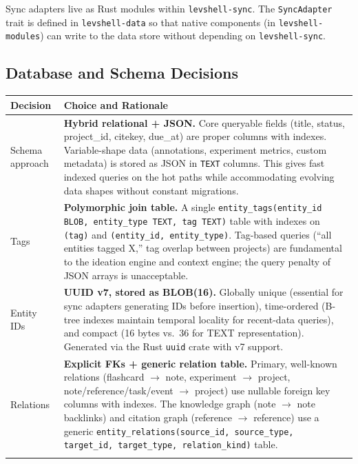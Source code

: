 \documentclass[11pt,a4paper]{article}
\begin{document}
Sync adapters live as Rust modules within \texttt{levshell-sync}. The \texttt{SyncAdapter} trait is defined in \texttt{levshell-data} so that native components (in \texttt{levshell-modules}) can write to the data store without depending on \texttt{levshell-sync}.


\subsection{Database and Schema Decisions}
\label{sec:db-decisions}

\begin{longtable}{p{4.5cm} p{9cm}}
\toprule
\textbf{Decision} & \textbf{Choice and Rationale} \\
\midrule
Schema approach & \textbf{Hybrid relational + JSON.} Core queryable fields (title, status, project\_id, citekey, due\_at) are proper columns with indexes. Variable-shape data (annotations, experiment metrics, custom metadata) is stored as JSON in \texttt{TEXT} columns. This gives fast indexed queries on the hot paths while accommodating evolving data shapes without constant migrations. \\
\addlinespace
Tags & \textbf{Polymorphic join table.} A single \texttt{entity\_tags(entity\_id BLOB, entity\_type TEXT, tag TEXT)} table with indexes on \texttt{(tag)} and \texttt{(entity\_id, entity\_type)}. Tag-based queries (``all entities tagged X,'' tag overlap between projects) are fundamental to the ideation engine and context engine; the query penalty of JSON arrays is unacceptable. \\
\addlinespace
Entity IDs & \textbf{UUID v7, stored as BLOB(16).} Globally unique (essential for sync adapters generating IDs before insertion), time-ordered (B-tree indexes maintain temporal locality for recent-data queries), and compact (16 bytes vs.\ 36 for TEXT representation). Generated via the Rust \texttt{uuid} crate with v7 support. \\
\addlinespace
Relations & \textbf{Explicit FKs + generic relation table.} Primary, well-known relations (flashcard $\to$ note, experiment $\to$ project, note/reference/task/event $\to$ project) use nullable foreign key columns with indexes. The knowledge graph (note $\to$ note backlinks) and citation graph (reference $\to$ reference) use a generic \texttt{entity\_relations(source\_id, source\_type, target\_id, target\_type, relation\_kind)} table. \\
\addlinespace

\end{longtable}
\end{document}
